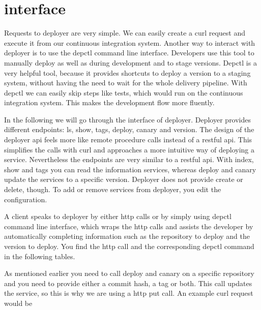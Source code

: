 \section{interface}
Requests to deployer are very simple. We can easily create a curl request and execute it
from our continuous integration system. Another way to interact with deployer is to use
the depctl command line interface. Developers use this tool to manually deploy as well as
during development and to stage versions. Depctl is a very helpful tool, because it
provides shortcuts to deploy a version to a staging system, without having the need to
wait for the whole delivery pipeline. With depctl we can easily skip steps like
tests, which would run on the continuous integration system. This makes the development
flow more fluently.

In the following we will go through the interface of deployer. Deployer provides different
endpoints: ls, show, tags, deploy, canary and version. The design of the deployer api
feels more like remote procedure calls instead of a restful api. This simplifies the calls
with curl and approaches a more intuitive way of deploying a service. Nevertheless the
endpoints are very similar to a restful api. With index, show and tags you can read the
information services, whereas deploy and canary update the services to a specific
version. Deployer does not provide create or delete, though. To add or remove services
from deployer, you edit the configuration.

A client speaks to deployer by either http calls or by simply using depctl command line
interface, which wraps the http calls and assists the developer by automatically
completing information such as the repository to deploy and the version to deploy. You
find the http call and the corresponding depctl command in the following tables.

As mentioned earlier you need to call deploy and canary on a specific repository and you
need to provide either a commit hash, a tag or both. This call updates the service, so
this is why we are using a http put call. An example curl request would be

